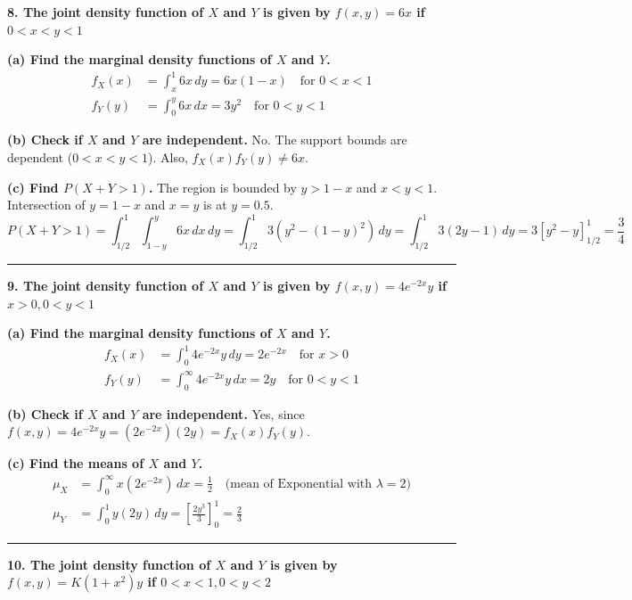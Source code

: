 \documentclass{article}
\begin{document}
\textbf{8. The joint density function of $X$ and $Y$ is given by $f(x, y) = 6x$ if $0 < x < y < 1$}

\textbf{(a) Find the marginal density functions of $X$ and $Y$.}
\begin{align*}
f_X(x) &= \int_{x}^{1} 6x \,dy = 6x(1-x) \quad \text{for } 0 < x < 1 \\
f_Y(y) &= \int_{0}^{y} 6x \,dx = 3y^2 \quad \text{for } 0 < y < 1
\end{align*}

\textbf{(b) Check if $X$ and $Y$ are independent.}
No. The support bounds are dependent ($0 < x < y < 1$). Also, $f_X(x)f_Y(y) \neq 6x$.

\textbf{(c) Find $P(X +Y > 1)$.}
The region is bounded by $y > 1-x$ and $x < y < 1$. Intersection of $y=1-x$ and $x=y$ is at $y=0.5$.
$$P(X+Y > 1) = \int_{1/2}^{1} \int_{1-y}^{y} 6x \,dx \,dy = \int_{1/2}^{1} 3(y^2 - (1-y)^2) \,dy = \int_{1/2}^{1} 3(2y - 1) \,dy = 3\left[y^2 - y\right]_{1/2}^1 = \frac{3}{4}$$

\vspace{1em}
\hrule
\vspace{1em}

\textbf{9. The joint density function of $X$ and $Y$ is given by $f(x, y) = 4e^{-2x}y$ if $x > 0, 0 < y < 1$}

\textbf{(a) Find the marginal density functions of $X$ and $Y$.}
\begin{align*}
f_X(x) &= \int_{0}^{1} 4e^{-2x}y \,dy = 2e^{-2x} \quad \text{for } x > 0 \\
f_Y(y) &= \int_{0}^{\infty} 4e^{-2x}y \,dx = 2y \quad \text{for } 0 < y < 1
\end{align*}

\textbf{(b) Check if $X$ and $Y$ are independent.}
Yes, since $f(x,y) = 4e^{-2x}y = (2e^{-2x})(2y) = f_X(x)f_Y(y)$.

\textbf{(c) Find the means of $X$ and $Y$.}
\begin{align*}
\mu_X &= \int_{0}^{\infty} x(2e^{-2x}) \,dx = \frac{1}{2} \quad \text{(mean of Exponential with } \lambda=2) \\
\mu_Y &= \int_{0}^{1} y(2y) \,dy = \left[ \frac{2y^3}{3} \right]_0^1 = \frac{2}{3}
\end{align*}

\vspace{1em}
\hrule
\vspace{1em}

\textbf{10. The joint density function of $X$ and $Y$ is given by $f(x,y) = K(1+x^2)y$ if $0 < x < 1, 0 < y < 2$}
\end{document}
